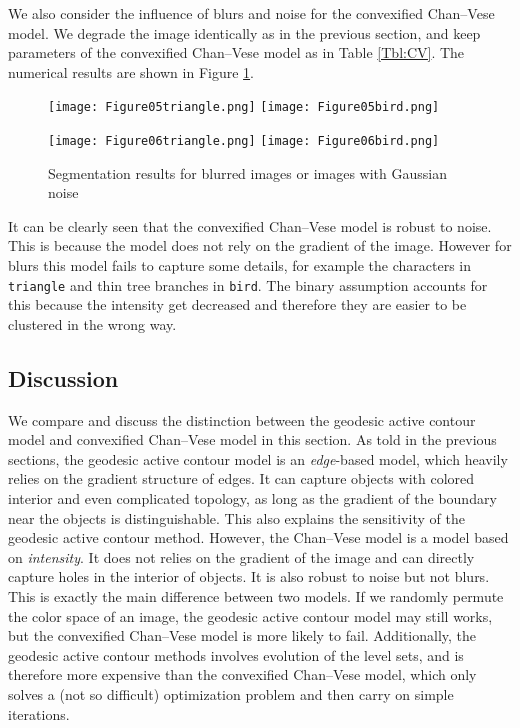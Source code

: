 \documentclass[english, nochinese]{pnote}
\begin{document}
We also consider the influence of blurs and noise for the convexified Chan--Vese model. We degrade the image identically as in the previous section, and keep parameters of the convexified Chan--Vese model as in Table \ref{Tbl:CV}. The numerical results are shown in Figure \ref{Fig:BlurNoise}.

\begin{figure}[htbp]
\centering

\texttt{[image: Figure05triangle.png]}
\texttt{[image: Figure05bird.png]}

\texttt{[image: Figure06triangle.png]}
\texttt{[image: Figure06bird.png]}

\caption{Segmentation results for blurred images or images with Gaussian noise}
\label{Fig:BlurNoise}
\end{figure}

It can be clearly seen that the convexified Chan--Vese model is robust to noise. This is because the model does not rely on the gradient of the image. However for blurs this model fails to capture some details, for example the characters in \verb"triangle" and thin tree branches in \verb"bird". The binary assumption accounts for this because the intensity get decreased and therefore they are easier to be clustered in the wrong way.

\subsection{Discussion}

We compare and discuss the distinction between the geodesic active contour model and convexified Chan--Vese model in this section. As told in the previous sections, the geodesic active contour model is an \emph{edge}-based model, which heavily relies on the gradient structure of edges. It can capture objects with colored interior and even complicated topology, as long as the gradient of the boundary near the objects is distinguishable. This also explains the sensitivity of the geodesic active contour method. However, the Chan--Vese model is a model based on \emph{intensity}. It does not relies on the gradient of the image and can directly capture holes in the interior of objects. It is also robust to noise but not blurs. This is exactly the main difference between two models. If we randomly permute the color space of an image, the geodesic active contour model may still works, but the convexified Chan--Vese model is more likely to fail. Additionally, the geodesic active contour methods involves evolution of the level sets, and is therefore more expensive than the convexified Chan--Vese model, which only solves a (not so difficult) optimization problem and then carry on simple iterations.

\printbibliography
\end{document}
